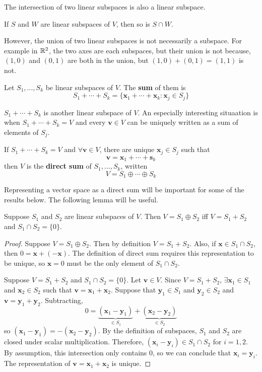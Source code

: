 The intersection of two linear subspaces is also a linear subspace.
\begin{example}
  If $S$ and $W$ are linear subspaces of $V$, then so is $S \cap W$.
\end{example}
However, the union of two linear subspaces is not necessarily a
subspace. For example in $\mathbb{R}^2$, the two axes are each subspaces, but
their union is not because, $(1,0)$ and $(0,1)$ are both in the union,
but $(1,0) + (0,1) = (1,1)$ is not. 
\begin{definition}
  Let $S_1, ..., S_k$ be linear subspaces of $V$. The \textbf{sum} of
  them is
  \[ S_1 + \cdots + S_k = \{ \mathbf{x}_1 + \cdots + \mathbf{x}_k :
  \mathbf{x}_j \in S_j \} \]
\end{definition}
$S_1 + \cdots + S_k$ is another linear subspace of $V$. An especially
interesting situaation is when $S_1 + \cdots + S_k = V$ and every
$\mathbf{v} \in V$ can be uniquely written as a sum of elements of
$S_j$. 
\begin{definition}
  If $S_1 + \cdots + S_k = V$ and $\forall \mathbf{v} \in V$, there
  are unique $\mathbf{x}_j \in S_j$ such that 
  \[ \mathbf{v} = \mathbf{x}_1 + \cdots  + \mathbf{s}_k \]
  then $V$ is the \textbf{direct sum} of $S_1, ..., S_k$, written 
  \[ V = S_1 \oplus \cdots \oplus S_k \]
\end{definition}
Representing a vector space as a direct sum will be important for some
of the results below. The following lemma will be useful.
\begin{lemma}
  Suppose $S_1$ and $S_2$ are linear subspaces of $V$. Then $V = S_1
  \oplus S_2$ iff $V = S_1 + S_2$ and $S_1 \cap S_2 = \{0\}$. 
\end{lemma}
\begin{proof}
  Suppose $V = S_1 \oplus S_2$. Then by definition $V = S_1 +
  S_2$. Also, if $\mathbf{x} \in S_1 \cap S_2$, then $0 = \mathbf{x} + (-\mathbf{x})$. The
  definition of direct sum requires this representation to be unique,
  so $\mathbf{x} = 0$ must be the only element of $S_1 \cap S_2$.

  Suppose $V = S_1 + S_2$ and $S_1 \cap S_2 = \{0\}$. Let $\mathbf{v} \in
  V$. Since $V = S_1 + S_2$, $\exists \mathbf{x}_1 \in S_1$ and $\mathbf{x}_2 \in S_2$
  such that $\mathbf{v} = \mathbf{x}_1 + \mathbf{x}_2$. Suppose that
  $\mathbf{y}_1 \in S_1$ and $\mathbf{y}_2 \in S_2$ and $\mathbf{v} =
  \mathbf{y}_1 + \mathbf{y}_2$. Subtracting, 
  \[ 0 = \underbrace{(\mathbf{x}_1 - \mathbf{y}_1)}_{\in S_1} + \underbrace{(\mathbf{x}_2 -
    \mathbf{y}_2)}_{\in S_2} \]
  so $(\mathbf{x}_1 - \mathbf{y}_1) = -(\mathbf{x}_2 -
  \mathbf{y}_2)$. By the definition of subspaces, $S_1$ and $S_2$ are
  closed under scalar multiplication. Therefore, $(\mathbf{x}_i -
  \mathbf{y}_i) \in S_1 \cap S_2$ for $i = 1, 2$. By assumption, this
  intersection only contains $0$, so we can conclude that
  $\mathbf{x}_i = \mathbf{y}_i$. The representation of $\mathbf{v} =
  \mathbf{x}_1 + \mathbf{x}_2$ is unique.
\end{proof}

